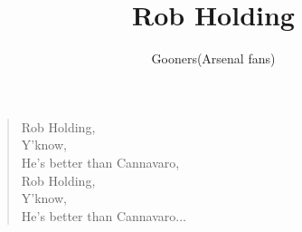 \documentclass[a4paper,12pt]{article}
\title{Rob Holding}
\author{Gooners(Arsenal fans)}
\date{}
\begin{document}
	
	\maketitle
	
	\begin{verse}
		
		Rob Holding, \\
		Y'know, \\
		He's better than Cannavaro, \\
		Rob Holding, \\
		Y'know, \\
		He's better than Cannavaro$\ldots$
		
	\end{verse}
	
\end{document}
